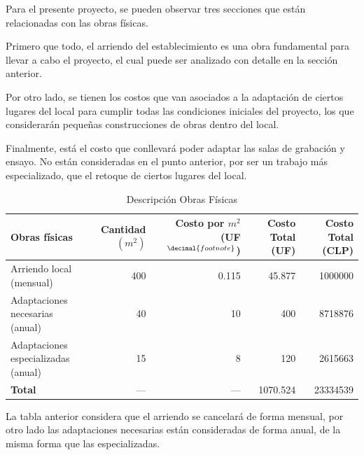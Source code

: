 Para el presente proyecto, se pueden observar tres secciones que están
relacionadas con las obras físicas.

Primero que todo, el arriendo del establecimiento es una obra
fundamental para llevar a cabo el proyecto, el cual puede
ser analizado con detalle en la sección anterior.

Por otro lado, se tienen los costos que van asociados a la adaptación
de ciertos lugares del local para cumplir todas las condiciones iniciales
del proyecto, los que considerarán pequeñas construcciones de obras dentro
del local.

Finalmente, está el costo que conllevará poder adaptar las salas
de grabación y ensayo. No están consideradas en el punto anterior,
por ser un trabajo más especializado, que el retoque de ciertos
lugares del local.


\addtocounter{footnote}{1}
\footnotetext[\value{footnote}]{Valor de la UF al 25 de Mayo del 2011 es de $21,797.19$ CLP}


\begin{table}[h]
\scriptsize
\centering
	\begin{tabular}{|l|r|r|r|r|}
	\hline
	\textbf{Obras físicas}       & \textbf{Cantidad $(m^2)$} & \textbf{Costo por $m^2$ (UF$^{\decimal{footnote}}$)} & \textbf{Costo Total (UF)} & \textbf{Costo Total (CLP)} \\\hline
	Arriendo local (mensual)               & 400                       & 0.115                         & 45.877                   & 1000000     \\\hline
	Adaptaciones necesarias (anual)     & 40                        & 10                            & 400                      & 8718876    \\\hline
	Adaptaciones especializadas (anual) & 15                        & 8                             & 120                      & 2615663     \\\hline
	\textbf{Total}  			 & ---                       & ---                           & 1070.524                 & 23334539   \\\hline
	\end{tabular}
\caption{Descripción Obras Físicas}
\label{tab:obras-fisicas}
\end{table}

La tabla anterior considera que el arriendo se cancelará de forma mensual,
por otro lado las adaptaciones necesarias están consideradas de forma anual,
de la misma forma que las especializadas.


